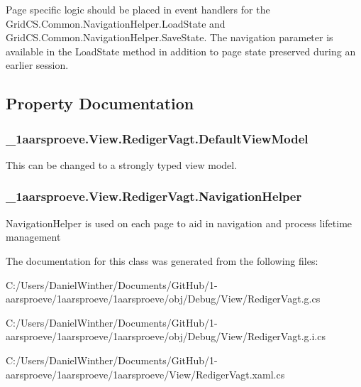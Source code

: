 Page specific logic should be placed in event handlers for the Grid\+C\+S.\+Common.\+Navigation\+Helper.\+Load\+State and Grid\+C\+S.\+Common.\+Navigation\+Helper.\+Save\+State. The navigation parameter is available in the Load\+State method in addition to page state preserved during an earlier session. 

\subsection{Property Documentation}
\hypertarget{class__1aarsproeve_1_1_view_1_1_rediger_vagt_af2df54817af67729bd484de917de7bb2}{}
\subsubsection[{Default\+View\+Model}]{ \+\_\+1aarsproeve.\+View.\+Rediger\+Vagt.\+Default\+View\+Model\hspace{0.3cm}{\ttfamily [get]}}\label{class__1aarsproeve_1_1_view_1_1_rediger_vagt_af2df54817af67729bd484de917de7bb2}


This can be changed to a strongly typed view model. 

\hypertarget{class__1aarsproeve_1_1_view_1_1_rediger_vagt_a205f8abe3b935baab61ee977737d2e03}{}
\subsubsection[{Navigation\+Helper}]{ \+\_\+1aarsproeve.\+View.\+Rediger\+Vagt.\+Navigation\+Helper\hspace{0.3cm}{\ttfamily [get]}}\label{class__1aarsproeve_1_1_view_1_1_rediger_vagt_a205f8abe3b935baab61ee977737d2e03}


Navigation\+Helper is used on each page to aid in navigation and process lifetime management 



The documentation for this class was generated from the following files\+:\begin{DoxyCompactItemize}
\item 
C\+:/\+Users/\+Daniel\+Winther/\+Documents/\+Git\+Hub/1-\/aarsproeve/1aarsproeve/1aarsproeve/obj/\+Debug/\+View/Rediger\+Vagt.\+g.\+cs\item 
C\+:/\+Users/\+Daniel\+Winther/\+Documents/\+Git\+Hub/1-\/aarsproeve/1aarsproeve/1aarsproeve/obj/\+Debug/\+View/Rediger\+Vagt.\+g.\+i.\+cs\item 
C\+:/\+Users/\+Daniel\+Winther/\+Documents/\+Git\+Hub/1-\/aarsproeve/1aarsproeve/1aarsproeve/\+View/Rediger\+Vagt.\+xaml.\+cs\end{DoxyCompactItemize}

